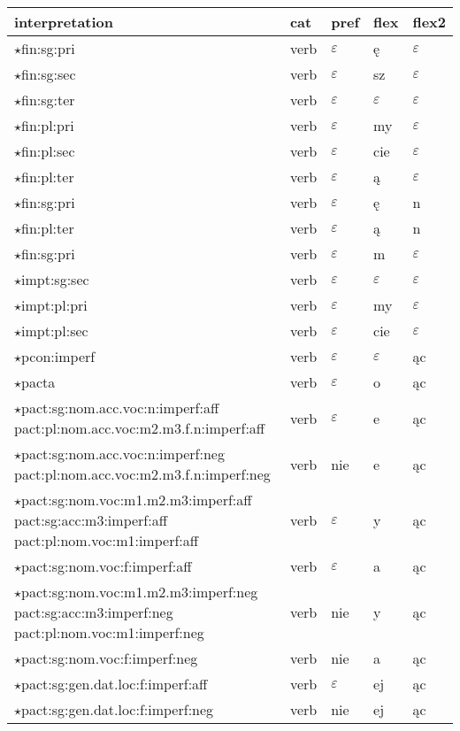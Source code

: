 \documentclass{article}
\begin{document}
\begin{longtable}{p{7cm}|l|l|l|l}
interpretation & cat & pref & flex & flex2\\
\hline
$\star$fin:sg:pri & verb & $\varepsilon$ & ę & $\varepsilon$\\
$\star$fin:sg:sec & verb & $\varepsilon$ & sz & $\varepsilon$\\
$\star$fin:sg:ter & verb & $\varepsilon$ & $\varepsilon$ & $\varepsilon$\\
$\star$fin:pl:pri & verb & $\varepsilon$ & my & $\varepsilon$\\
$\star$fin:pl:sec & verb & $\varepsilon$ & cie & $\varepsilon$\\
$\star$fin:pl:ter & verb & $\varepsilon$ & ą & $\varepsilon$\\
$\star$fin:sg:pri & verb & $\varepsilon$ & ę & n\\
$\star$fin:pl:ter & verb & $\varepsilon$ & ą & n\\
$\star$fin:sg:pri & verb & $\varepsilon$ & m & $\varepsilon$\\
$\star$impt:sg:sec & verb & $\varepsilon$ & $\varepsilon$ & $\varepsilon$\\
$\star$impt:pl:pri & verb & $\varepsilon$ & my & $\varepsilon$\\
$\star$impt:pl:sec & verb & $\varepsilon$ & cie & $\varepsilon$\\
$\star$pcon:imperf & verb & $\varepsilon$ & $\varepsilon$ & ąc\\
$\star$pacta & verb & $\varepsilon$ & o & ąc\\
$\star$pact:sg:nom.acc.voc:n:imperf:aff pact:pl:nom.acc.voc:m2.m3.f.n:imperf:aff & verb & $\varepsilon$ & e & ąc\\
$\star$pact:sg:nom.acc.voc:n:imperf:neg pact:pl:nom.acc.voc:m2.m3.f.n:imperf:neg & verb & nie & e & ąc\\
$\star$pact:sg:nom.voc:m1.m2.m3:imperf:aff pact:sg:acc:m3:imperf:aff pact:pl:nom.voc:m1:imperf:aff & verb & $\varepsilon$ & y & ąc\\
$\star$pact:sg:nom.voc:f:imperf:aff & verb & $\varepsilon$ & a & ąc\\
$\star$pact:sg:nom.voc:m1.m2.m3:imperf:neg pact:sg:acc:m3:imperf:neg pact:pl:nom.voc:m1:imperf:neg & verb & nie & y & ąc\\
$\star$pact:sg:nom.voc:f:imperf:neg & verb & nie & a & ąc\\
$\star$pact:sg:gen.dat.loc:f:imperf:aff & verb & $\varepsilon$ & ej & ąc\\
$\star$pact:sg:gen.dat.loc:f:imperf:neg & verb & nie & ej & ąc\\

\end{longtable}
\end{document}

